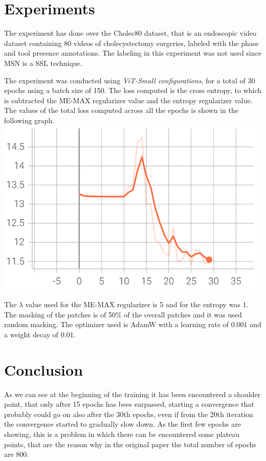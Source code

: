 \documentclass[column]{article}
\begin{document}
		
	\begin{multicols}{2}
		
	\section{Experiments}
	
	The experiment has done over the Cholec80 dataset, that is an endoscopic video dataset containing 80 videos of cholecystectomy surgeries, labeled with the phase and tool presence annotations. The labeling in this experiment was not used since MSN is a SSL technique.
	
	The experiment was conducted using \textit{ViT-Small configurations}, for a total of 30 epochs using a batch size of 150. The loss computed is the cross entropy, to which is subtracted the ME-MAX regularizer value and the entropy regularizer value. The values of the total loss computed across all the epochs is shown in the following graph. 
	\includegraphics[width=0.9\linewidth]{Images/screenshot002}
	
	The $\lambda$ value used for the ME-MAX regularizer is 5 and for the entropy was 1. The masking of the patches is of 50\% of the overall patches and it was used random masking. The optimizer used is AdamW with a learning rate of $0.001$ and a weight decay of $0.01$. 
	
	
	
	\section{Conclusion}
	
	As we can see at the beginning of the training it has been encountered a shoulder point, that only after 15 epochs has bees surpassed, starting a convergence that probably could go on also after the 30th epochs, even if from the 20th iteration the convergence started to gradually slow down. As the first few epochs are showing, this is a problem in which there can be encountered some plateau points, that are the reason why in the original paper the total number of epochs are 800. 
	

\end{multicols}
\end{document}
